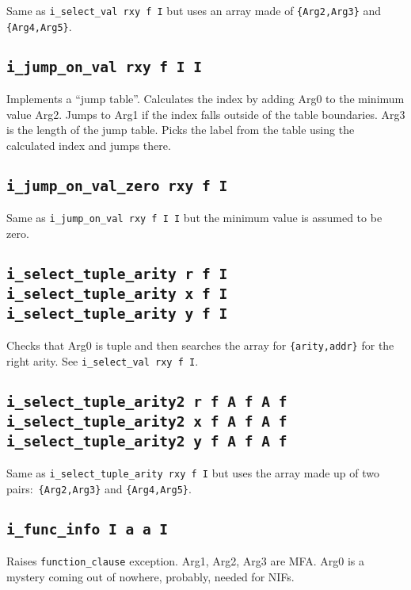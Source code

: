 \documentclass{article}
\newcommand{\iop}[1]{\texttt{#1}}
\begin{document}
Same as \iop{i\_select\_val rxy f I} but uses an array made of
\verb${Arg2,Arg3}$ and \verb${Arg4,Arg5}$.

\subsection*{\iop{i\_jump\_on\_val rxy f I I}}

Implements a ``jump table''. Calculates the index by adding Arg0 to the minimum
value Arg2. Jumps to Arg1 if the index falls outside of the table boundaries.
Arg3 is the length of the jump table. Picks the label from the table using the
calculated index and jumps there. 

\subsection*{\iop{i\_jump\_on\_val\_zero rxy f I}}

Same as \iop{i\_jump\_on\_val rxy f I I} but the minimum value is assumed to be
zero.

\subsection*{\iop{i\_select\_tuple\_arity r f I}\\
\iop{i\_select\_tuple\_arity x f I}\\
\iop{i\_select\_tuple\_arity y f I}}

Checks that Arg0 is tuple and then searches the array for \verb${arity,addr}$
for the right arity. See \iop{i\_select\_val rxy f I}.

\subsection*{\iop{i\_select\_tuple\_arity2 r f A f A f}\\
\iop{i\_select\_tuple\_arity2 x f A f A f}\\
\iop{i\_select\_tuple\_arity2 y f A f A f}}

Same as \iop{i\_select\_tuple\_arity rxy f I} but uses the array made up of two
pairs$:$ \verb${Arg2,Arg3}$ and \verb${Arg4,Arg5}$.

\subsection*{\iop{i\_func\_info I a a I}}

Raises \texttt{function\_clause} exception. Arg1, Arg2, Arg3 are MFA. Arg0 is
a mystery coming out of nowhere, probably, needed for NIFs.
\end{document}
